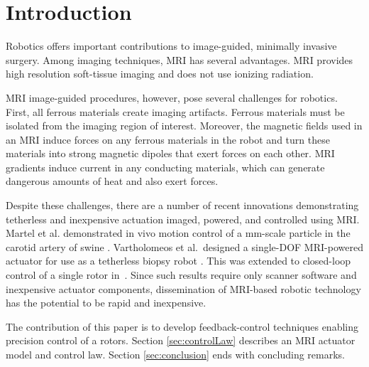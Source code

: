 \section{Introduction}\label{sec:Intro}

Robotics offers important contributions to image-guided, minimally invasive surgery.  
Among imaging techniques,  MRI has several advantages.  MRI provides high resolution soft-tissue imaging and does not use ionizing radiation. 
%

 MRI  image-guided procedures, however, pose several challenges for robotics\cite{Ho2012TRO,fischer2008mri,Martel2007,Vartholomeos2011,Vartholomeos2013}.  First, all ferrous materials create imaging artifacts.  Ferrous materials must be isolated from the imaging region of interest.  Moreover, the magnetic fields used in an MRI induce forces on any ferrous materials in the robot and turn these materials into strong magnetic dipoles that exert forces on each other.   MRI gradients induce current in any conducting materials, which can generate dangerous amounts of heat and also exert forces. 
 
Despite these challenges, there are a number of recent innovations demonstrating tetherless and inexpensive actuation imaged, powered, and controlled using MRI.   Martel et al. demonstrated in vivo motion control of a mm-scale particle in the carotid artery of swine \cite{Martel2007}. Vartholomeos et al.~designed a single-DOF MRI-powered actuator for use as a tetherless biopsy robot \cite{Vartholomeos2011}.  This was extended to closed-loop control of a single rotor in~\cite{Vartholomeos2013}. Since such results require only scanner software and inexpensive actuator components, dissemination of MRI-based robotic technology has the potential to be rapid and inexpensive.


The contribution of this paper is to develop feedback-control techniques enabling precision control of a rotors. Section \ref{sec:controlLaw} describes an MRI actuator model and control law.    Section \ref{sec:conclusion} ends with concluding remarks.
  
  
 

